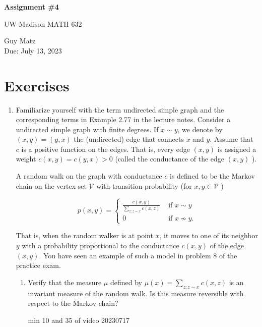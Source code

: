 \documentclass{article} %
\theoremstyle{plain}
\theoremstyle{case}
\begin{document}
\begin{center}
\Large{\textbf{Assignment \#4}
            
UW-Madison MATH 632} %
\vspace{5pt}
        
\normalsize{  Guy Matz%
        \\ Due: July 13, 2023}
\vspace{15pt}
\end{center}

\section*{Exercises}%

\begin{enumerate}[label={\fbox{\textbf{Exercise \#\arabic* :}}}]

  \item Familiarize yourself with the term undirected simple graph and the corresponding terms in Example 2.77 in the lecture notes. Consider a undirected simple graph with finite degrees. If $x \sim y$, we denote by $(x, y)=(y, x)$ the (undirected) edge that connects $x$ and $y$. Assume that $c$ is a positive function on the edges. That is, every edge $(x, y)$ is assigned a weight $c(x, y)=c(y, x)>0$ (called the conductance of the edge $(x, y)$ ).

A random walk on the graph with conductance $c$ is defined to be the Markov chain on the vertex set $\mathcal{V}$ with transition probability (for $x, y \in \mathcal{V}$ )

$$
p(x, y)= \begin{cases}\frac{c(x, y)}{\sum_{z: z \sim x} c(x, z)} & \text { if } x \sim y \\ 0 & \text { if } x \not\sim y .\end{cases}
$$

That is, when the random walker is at point $x$, it moves to one of its neighbor $y$ with a probability proportional to the conductance $c(x, y)$ of the edge $(x, y)$. You have seen an example of such a model in problem 8 of the practice exam.
  \begin{enumerate}
    \item  Verify that the measure $\mu$ defined by $\mu(x)=\sum_{z: z \sim x} c(x, z)$ is an invariant measure of the random walk. Is this measure reversible with respect to the Markov chain?

      min 10  and 35 of video 20230717


\end{enumerate}
\end{enumerate}
\end{document}
